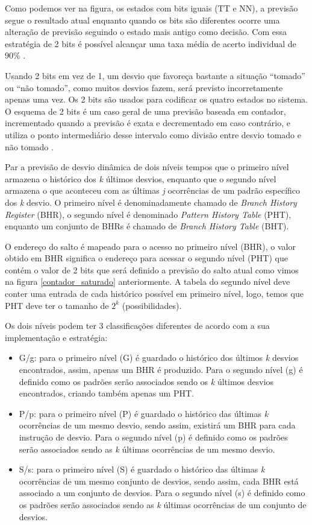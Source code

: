 \documentclass[journal, twoside]{IEEEtran}
\begin{document}
Como podemos ver na figura, os estados com bits iguais (TT e NN), a previsão segue o resultado atual enquanto quando os bits são diferentes ocorre uma alteração de previsão seguindo o estado mais antigo como decisão. Com essa estratégia de 2 bits é possível alcançar uma taxa média de acerto individual de 90\% \cite{lee_smith}. 

Usando 2 bits em vez de 1, um desvio que favoreça bastante a situação “tomado” ou “não tomado”, como muitos desvios fazem, será previsto incorretamente apenas uma vez. Os 2 bits são usados para codificar os quatro estados no sistema. O esquema de 2 bits é um caso geral de uma previsão baseada em contador, incrementado quando a previsão é exata e decrementado em caso contrário, e
utiliza o ponto intermediário desse intervalo como divisão entre desvio tomado e não tomado \cite{patterson_hennessy}. 

Par a previsão de desvio dinâmica de dois níveis tempos que o primeiro nível armazena o histórico dos \textit{k} últimos desvios, enquanto que o segundo nível armazena o que aconteceu com as últimas \textit{j} ocorrências de um padrão específico dos \textit{k} desvio. O primeiro nível é denominadamente chamado de \textit{Branch History Register} (BHR), o segundo nível é denominado \textit{Pattern History Table} (PHT), enquanto um conjunto de BHRs é chamado de \textit{Branch History Table} (BHT).

O endereço do salto é mapeado para o acesso no primeiro nível (BHR), o valor obtido em BHR significa o endereço para acessar o segundo nível (PHT) que contém o valor de 2 bits que será definido a previsão do salto atual como vimos na figura \ref{contador_saturado} anteriormente. A tabela do segundo nível deve conter uma entrada de cada histórico possível em primeiro nível, logo, temos que PHT deve ter o tamanho de \(2^k\) (possibilidades).

Os dois níveis podem ter 3 classificações diferentes de acordo com a sua implementação e estratégia:

\begin{itemize}
    \item G/g: para o primeiro nível (G) é guardado o histórico dos últimos \textit{k} desvios encontrados, assim, apenas um BHR é produzido. Para o segundo nível (g) é definido como os padrões serão associados sendo os \textit{k} últimos desvios encontrados, criando também apenas um PHT. 
    \item P/p: para o primeiro nível (P) é guardado o histórico das últimas \textit{k} ocorrências de um mesmo desvio, sendo assim, existirá um BHR para cada instrução de desvio. Para o segundo nível (p) é definido como os padrões serão associados sendo as \textit{k} últimas ocorrências de um mesmo desvio.
    \item S/s: para o primeiro nível (S) é guardado o histórico das últimas \textit{k} ocorrências de um mesmo conjunto de desvios, sendo assim, cada BHR está associado a um conjunto de desvios. Para o segundo nível (s) é definido como os padrões serão associados sendo as \textit{k} últimas ocorrências de um conjunto de desvios. 
\end{itemize}
\end{document}

